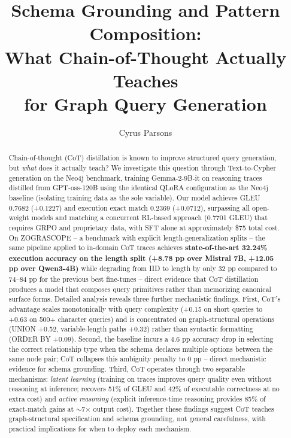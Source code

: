 \documentclass[11pt]{article}
\title{Schema Grounding and Pattern Composition:\\What Chain-of-Thought Actually Teaches\\for Graph Query Generation}
\author{Cyrus Parsons}
\date{}
\begin{document}
\maketitle

\begin{abstract}
Chain-of-thought (CoT) distillation is known to improve structured query generation, but \emph{what} does it actually teach? We investigate this question through Text-to-Cypher generation on the Neo4j benchmark, training Gemma-2-9B-it on reasoning traces distilled from GPT-oss-120B using the identical QLoRA configuration as the Neo4j baseline (isolating training data as the sole variable). Our model achieves GLEU 0.7682 (+0.1227) and execution exact match 0.2369 (+0.0712), surpassing all open-weight models and matching a concurrent RL-based approach (0.7701 GLEU) that requires GRPO and proprietary data, with SFT alone at approximately \$75 total cost. On ZOGRASCOPE -- a benchmark with explicit length-generalization splits -- the same pipeline applied to in-domain CoT traces achieves \textbf{state-of-the-art 32.24\% execution accuracy on the length split (+8.78 pp over Mistral 7B, +12.05 pp over Qwen3-4B)} while degrading from IID to length by only 32 pp compared to 74--84 pp for the previous best fine-tunes -- direct evidence that CoT distillation produces a model that composes query primitives rather than memorizing canonical surface forms. Detailed analysis reveals three further mechanistic findings. First, CoT's advantage scales monotonically with query complexity (+0.15 on short queries to +0.63 on 500+ character queries) and is concentrated on graph-structural operations (UNION +0.52, variable-length paths +0.32) rather than syntactic formatting (ORDER BY +0.09). Second, the baseline incurs a 4.6 pp accuracy drop in selecting the correct relationship type when the schema declares multiple options between the same node pair; CoT collapses this ambiguity penalty to 0 pp -- direct mechanistic evidence for schema grounding. Third, CoT operates through two separable mechanisms: \emph{latent learning} (training on traces improves query quality even without reasoning at inference; recovers 51\% of GLEU and 42\% of executable correctness at no extra cost) and \emph{active reasoning} (explicit inference-time reasoning provides 85\% of exact-match gains at ${\sim}$7$\times$ output cost). Together these findings suggest CoT teaches graph-structural specification and schema grounding, not general carefulness, with practical implications for when to deploy each mechanism.
\end{abstract}
\end{document}
